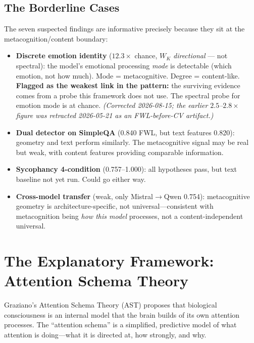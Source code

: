 \documentclass[11pt,letterpaper]{article}
\begin{document}
\subsection{The Borderline Cases}

The seven suspected findings are informative precisely because they
sit at the metacognition/content boundary:

\begin{itemize}[nosep]
\item \textbf{Discrete emotion identity} ($12.3\times$ chance, $W_K$
\emph{directional} --- not spectral): the model's emotional processing \emph{mode}
is detectable (which emotion, not how much). Mode = metacognitive. Degree =
content-like. \textbf{Flagged as the weakest link in the pattern:} the surviving
evidence comes from a probe this framework does not use. The spectral probe for
emotion mode is at chance. \emph{(Corrected 2026-08-15; the earlier
$2.5$--$2.8\times$ figure was retracted 2026-05-21 as an FWL-before-CV artifact.)}

\item \textbf{Dual detector on SimpleQA} (0.840 FWL, but text
features 0.820): geometry and text perform similarly. The metacognitive
signal may be real but weak, with content features providing
comparable information.

\item \textbf{Sycophancy 4-condition} (0.757--1.000): all hypotheses
pass, but text baseline not yet run. Could go either way.

\item \textbf{Cross-model transfer} (weak, only Mistral$\to$Qwen
0.754): metacognitive geometry is architecture-specific, not
universal---consistent with metacognition being \emph{how this model}
processes, not a content-independent universal.
\end{itemize}

\section{The Explanatory Framework: Attention Schema Theory}

Graziano's Attention Schema Theory (AST) proposes that biological
consciousness is an internal model that the brain builds of its own
attention processes. The ``attention schema'' is a simplified,
predictive model of what attention is doing---what it is directed at,
how strongly, and why.
\end{document}
